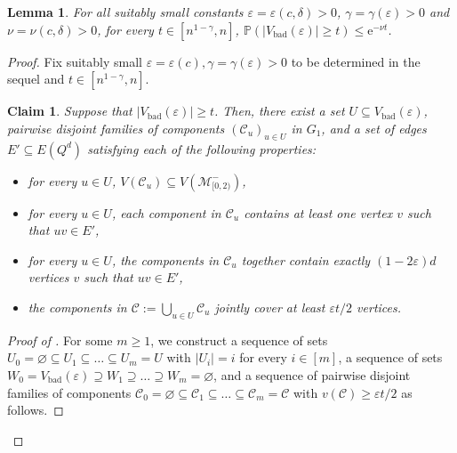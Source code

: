 \documentclass[reqno,final,a4paper]{amsart}
\newtheorem{lemma}[thm]{Lemma}
\newtheorem{claim}[thm]{Claim}
\theoremstyle{definition}
\newcommand{\cC}{\mathcal{C}}
\newcommand{\cM}{\mathcal{M}}
\def\e{\mathrm{e}}
\def\eps{\varepsilon}
\def\vbad{V_{\mathrm{bad}}}
\newcommand{\1}{\mathbbm{1}}
\begin{document}
\begin{lemma}\label{l: large components are well spread}
For all suitably small constants $\eps = \eps(c,\delta)>0$, $\gamma = \gamma(\eps)>0$ and $\nu=\nu(c,\delta)>0$, for every $t\in [n^{1-\gamma},n]$, $\mathbb{P}(|\vbad(\eps)|\ge t)\le \e^{-\nu t}$.
\end{lemma}
\begin{proof}
Fix suitably small $\eps= \eps(c),\gamma=\gamma(\eps)>0$ to be determined in the sequel and $t\in [n^{1-\gamma},n]$.

\begin{claim}\label{cl:associate}
Suppose that $|\vbad(\eps)|\ge t$. Then, there exist a set $U\subseteq \vbad(\eps)$, pairwise disjoint families of components $(\cC_u)_{u\in U}$ in $G_1$, and a set of edges $E'\subseteq E(Q^d)$ satisfying each of the following properties:
\begin{itemize}
    \item for every $u\in U$, $V(\cC_u)\subseteq V(\cM_{[0,2)}^-)$,
    \item for every $u\in U$, each component in $\cC_u$ contains at least one vertex $v$ such that $uv\in E'$,
    \item for every $u\in U$, the components in $\cC_u$ together contain exactly $(1-2\eps)d$ vertices $v$ such that $uv\in E'$,
    \item the components in $\cC := \bigcup_{u\in U} \cC_u$ jointly cover at least $\eps t/2$ vertices.
\end{itemize}
\end{claim}
\begin{proof}[Proof of ]
For some $m\ge 1$, we construct a sequence of sets $U_0=\varnothing\subseteq U_1\subseteq \ldots \subseteq U_m = U$ with $|U_i|=i$ for every $i\in [m]$, a sequence of sets $W_0=\vbad(\eps)\supseteq W_1\supseteq \ldots \supseteq W_m=\varnothing$, and a sequence of pairwise disjoint families of components $\cC_0=\varnothing\subseteq \cC_1\subseteq \ldots \subseteq \cC_m = \cC$ with $v(\cC)\ge \eps t/2$ as follows. 


\end{proof}
\end{proof}
\end{document}

